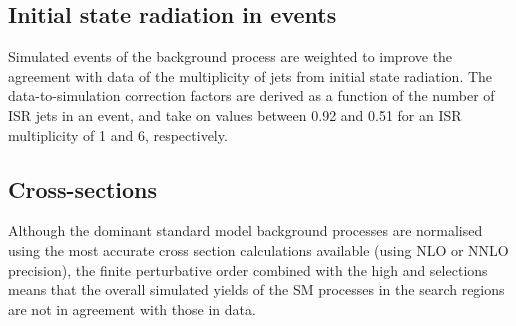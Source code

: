 

\subsection{Initial state radiation in \ttbar events}

Simulated events of the \ttbar background process are weighted to improve the 
agreement with data of the multiplicity of jets from initial state radiation. 
The data-to-simulation correction factors are derived as a function of the 
number of ISR jets in an event, and take on values between 0.92 and 0.51 for an 
ISR multiplicity of 1 and 6, respectively.

\subsection{Cross-sections}
Although the dominant standard model background processes are normalised using 
the most accurate cross section calculations available (using NLO or NNLO 
precision), the finite perturbative order combined with the high \scalht and 
\met selections means that the overall simulated yields of the SM processes in 
the search regions are not in agreement with those in data.

